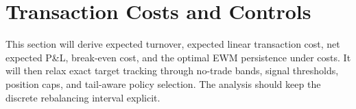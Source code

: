 \section{Transaction Costs and Controls}

This section will derive expected turnover, expected linear transaction cost, net expected P\&L, break-even cost, and the optimal EWM persistence under costs. It will then relax exact target tracking through no-trade bands, signal thresholds, position caps, and tail-aware policy selection. The analysis should keep the discrete rebalancing interval explicit.
